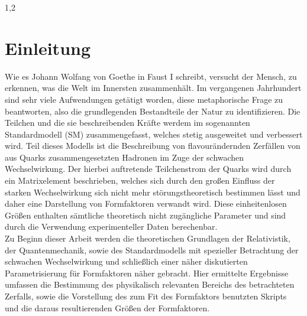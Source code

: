 \documentclass[11pt,a4paper,twoside,draft]{report}
\begin{document}
\begin{spacing}{1,2}
\newpage


\tableofcontents\newpage
{}
\listoffigures\newpage
{}
\listoftables\newpage

\setcounter{page}{0}

\chapter{Einleitung}
Wie es Johann Wolfang von Goethe in Faust I schreibt, versucht der Mensch, zu erkennen, was die Welt im Innersten zusammenhält. Im vergangenen Jahrhundert
sind sehr viele Aufwendungen getätigt worden, diese metaphorische Frage zu beantworten, also die grundlegenden Bestandteile der Natur zu identifizieren.
Die Teilchen und die sie beschreibenden Kräfte werdem im sogenannten Standardmodell (SM) zusammengefasst, welches stetig ausgeweitet und verbessert wird.
Teil dieses Modells ist die Beschreibung von flavourändernden Zerfällen von aus Quarks zusammengesetzten Hadronen im Zuge der schwachen Wechselwirkung. 
Der hierbei auftretende Teilchenstrom der Quarks wird durch ein Matrixelement beschrieben, welches sich durch den großen Einfluss der starken Wechselwirkung
sich nicht mehr störungstheoretisch bestimmen lässt und daher eine Darstellung von Formfaktoren verwandt wird. Diese einheitenlosen Größen enthalten sämtliche
theoretisch nicht zugängliche Parameter und sind durch die Verwendung experimenteller Daten berechenbar.\\
\noindent
Zu Beginn dieser Arbeit werden die theoretischen Grundlagen der Relativistik, der Quantenmechanik, sowie des Standardmodells mit spezieller Betrachtung der 
schwachen Wechselwirkung und schließlich einer näher diskutierten Parametrisierung für Formfaktoren näher gebracht. Hier ermittelte Ergebnisse umfassen
die Bestimmung des physikalisch relevanten Bereichs des betrachteten Zerfalls, sowie die Vorstellung des zum Fit des Formfaktors benutzten Skripts und die 
daraus resultierenden Größen der Formfaktoren.


\end{spacing}
\end{document}
